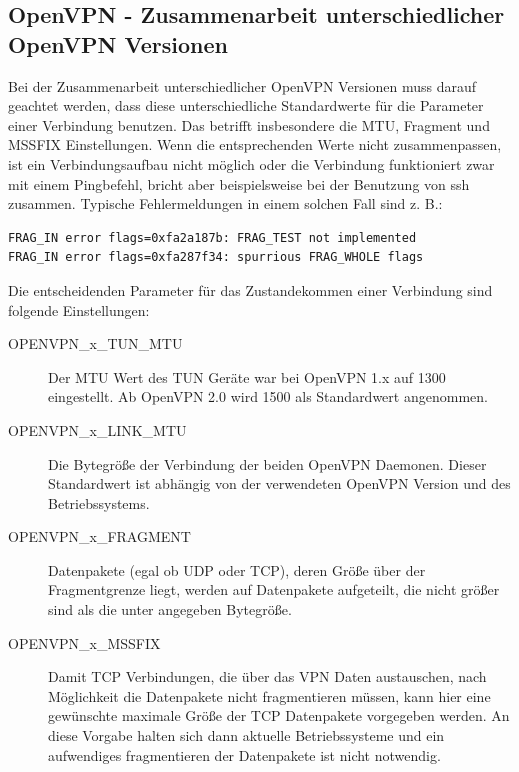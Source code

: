 \subsection{OpenVPN - Zusammenarbeit unterschiedlicher OpenVPN Versionen}

Bei der Zusammenarbeit unterschiedlicher OpenVPN Versionen muss darauf
geachtet werden, dass diese unterschiedliche Standardwerte für die
Parameter einer Verbindung benutzen. Das betrifft insbesondere die
MTU, Fragment und MSSFIX Einstellungen. Wenn die entsprechenden Werte
nicht \glqq{}zusammenpassen\grqq{}, ist ein Verbindungsaufbau nicht
möglich oder die Verbindung funktioniert zwar mit einem Pingbefehl,
bricht aber beispielsweise bei der Benutzung von ssh
zusammen. Typische Fehlermeldungen in einem solchen Fall sind z. B.:

\begin{example}
\begin{verbatim}
FRAG_IN error flags=0xfa2a187b: FRAG_TEST not implemented
FRAG_IN error flags=0xfa287f34: spurrious FRAG_WHOLE flags
\end{verbatim}
\end{example}

Die entscheidenden Parameter für das Zustandekommen einer Verbindung
sind folgende Einstellungen:

\begin{description}

\item [OPENVPN\_x\_TUN\_MTU] Der MTU Wert des TUN Geräte war bei
  OpenVPN 1.x auf 1300 eingestellt. Ab OpenVPN 2.0 wird 1500 als
  Standardwert angenommen.

\item [OPENVPN\_x\_LINK\_MTU] Die Bytegröße der Verbindung der beiden
  OpenVPN Daemonen. Dieser Standardwert ist abhängig von der
  verwendeten OpenVPN Version und des Betriebssystems.

\item [OPENVPN\_x\_FRAGMENT] Datenpakete (egal ob UDP oder TCP), deren
  Größe über der Fragmentgrenze liegt, werden auf Datenpakete
  aufgeteilt, die nicht größer sind als die unter 
  angegeben Bytegröße.

\item [OPENVPN\_x\_MSSFIX] Damit TCP Verbindungen, die über das VPN
  Daten austauschen, nach Möglichkeit die Datenpakete nicht
  fragmentieren müssen, kann hier eine gewünschte maximale Größe der
  TCP Datenpakete vorgegeben werden. An diese Vorgabe halten sich dann
  aktuelle Betriebssysteme und ein aufwendiges fragmentieren der
  Datenpakete ist nicht notwendig.

\end{description}

